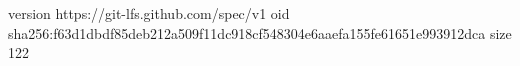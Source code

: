 version https://git-lfs.github.com/spec/v1
oid sha256:f63d1dbdf85deb212a509f11dc918cf548304e6aaefa155fe61651e993912dca
size 122
